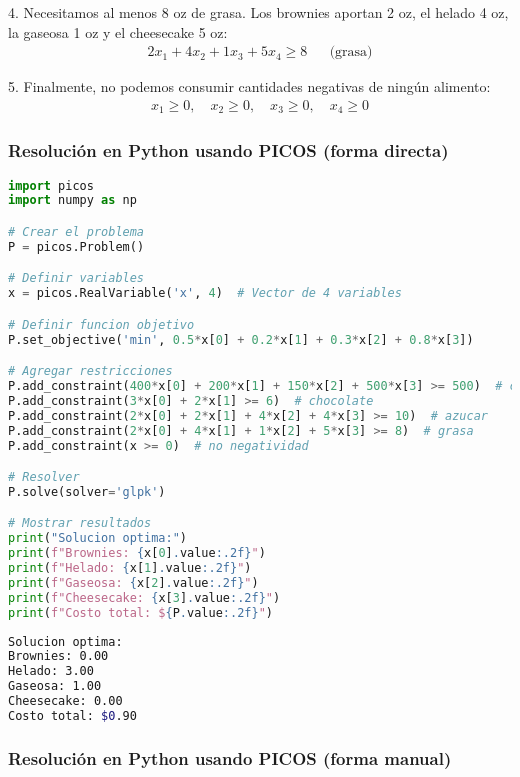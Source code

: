 \documentclass[12pt]{article}
\begin{document}
4. Necesitamos al menos 8 oz de grasa. Los brownies aportan 2 oz, el helado 4 oz, la gaseosa 1 oz y el cheesecake 5 oz:
\begin{align*}
    2x_1 + 4x_2 + 1x_3 + 5x_4 \geq 8 && \text{(grasa)}
\end{align*}

5. Finalmente, no podemos consumir cantidades negativas de ningún alimento:
\begin{align*}
    x_1 \geq 0,\quad x_2 \geq 0,\quad x_3 \geq 0,\quad x_4 \geq 0
\end{align*}

\subsubsection{Resolución en Python usando PICOS (forma directa)}

\begin{lstlisting}[language=Python]
import picos
import numpy as np

# Crear el problema
P = picos.Problem()

# Definir variables
x = picos.RealVariable('x', 4)  # Vector de 4 variables

# Definir funcion objetivo
P.set_objective('min', 0.5*x[0] + 0.2*x[1] + 0.3*x[2] + 0.8*x[3])

# Agregar restricciones
P.add_constraint(400*x[0] + 200*x[1] + 150*x[2] + 500*x[3] >= 500)  # calorias
P.add_constraint(3*x[0] + 2*x[1] >= 6)  # chocolate
P.add_constraint(2*x[0] + 2*x[1] + 4*x[2] + 4*x[3] >= 10)  # azucar
P.add_constraint(2*x[0] + 4*x[1] + 1*x[2] + 5*x[3] >= 8)  # grasa
P.add_constraint(x >= 0)  # no negatividad

# Resolver
P.solve(solver='glpk')

# Mostrar resultados
print("Solucion optima:")
print(f"Brownies: {x[0].value:.2f}")
print(f"Helado: {x[1].value:.2f}")
print(f"Gaseosa: {x[2].value:.2f}")
print(f"Cheesecake: {x[3].value:.2f}")
print(f"Costo total: ${P.value:.2f}")
\end{lstlisting}

\begin{lstlisting}[language=bash,backgroundcolor=\color{black},basicstyle=\color{white}\ttfamily,numbers=none]
Solucion optima:
Brownies: 0.00
Helado: 3.00
Gaseosa: 1.00
Cheesecake: 0.00
Costo total: $0.90
\end{lstlisting}

\subsubsection{Resolución en Python usando PICOS (forma manual)}
\end{document}
